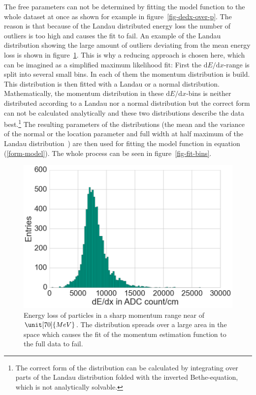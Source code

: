 The free parameters can not be determined by fitting the model function to the whole dataset at once as shown for example in figure~\ref{fig-dedx-over-p}. The reason is that because of the Landau distributed energy loss the number of outliers is too high and causes the fit to fail. An example of the Landau distribution showing the large amount of outliers deviating from the mean energy loss is shown in figure~\ref{fig-landau}. This is why a reducing approach is chosen here, which can be imagined as a simplified maximum likelihood fit: First the $\mathrm d E / \mathrm d x$-range is split into several small bins. In each of them the momentum distribution is build. This distribution is then fitted with a Landau or a normal distribution. Mathematically, the momentum distribution in these $\mathrm d E / \mathrm d x$-bins is neither distributed according to a Landau nor a normal distribution but the correct form can not be calculated analytically and these two distributions describe the data best.\footnote{The correct form of the distribution can be calculated by integrating over parts of the Landau distribution folded with the inverted Bethe-equation, which is not analytically solvable.} The resulting parameters of the distributions (the mean and the variance of the normal or the location parameter and full width at half maximum of the Landau distribution~\cite{landau}) are then used for fitting the model function in equation (\ref{form-model}). The whole process can be seen in figure~\ref{fig-fit-bins}.

\begin{figure}
  \centering
  \includegraphics[width=0.7\linewidth]{figures/vxd/landau.png}
  \caption[Energy loss of particles in a sharp momentum range near of 70 MeV.]{Energy loss of particles in a sharp momentum range near of $\unit[70]{MeV}$. The distribution spreads over a large area in the \dedx space which causes the fit of the momentum estimation function to the full data to fail.}
  \label{fig-landau}
\end{figure}

